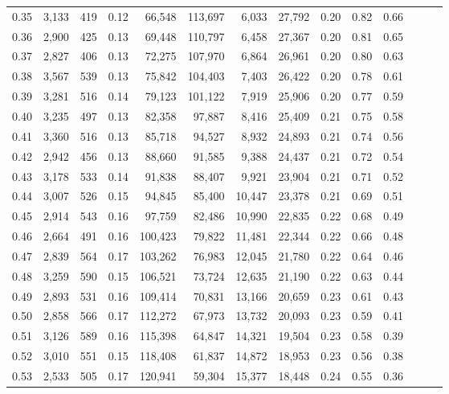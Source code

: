 \begin{tabular}{rrrrrrrrrrrrrr}
0.35 &  3,133 &  419 &  0.12 &   66,548 &  113,697 &   6,033 &  27,792 &  0.20 &  0.82 &      0.66 \\
0.36 &  2,900 &  425 &  0.13 &   69,448 &  110,797 &   6,458 &  27,367 &  0.20 &  0.81 &      0.65 \\
0.37 &  2,827 &  406 &  0.13 &   72,275 &  107,970 &   6,864 &  26,961 &  0.20 &  0.80 &      0.63 \\
0.38 &  3,567 &  539 &  0.13 &   75,842 &  104,403 &   7,403 &  26,422 &  0.20 &  0.78 &      0.61 \\
0.39 &  3,281 &  516 &  0.14 &   79,123 &  101,122 &   7,919 &  25,906 &  0.20 &  0.77 &      0.59 \\
0.40 &  3,235 &  497 &  0.13 &   82,358 &   97,887 &   8,416 &  25,409 &  0.21 &  0.75 &      0.58 \\
0.41 &  3,360 &  516 &  0.13 &   85,718 &   94,527 &   8,932 &  24,893 &  0.21 &  0.74 &      0.56 \\
0.42 &  2,942 &  456 &  0.13 &   88,660 &   91,585 &   9,388 &  24,437 &  0.21 &  0.72 &      0.54 \\
0.43 &  3,178 &  533 &  0.14 &   91,838 &   88,407 &   9,921 &  23,904 &  0.21 &  0.71 &      0.52 \\
0.44 &  3,007 &  526 &  0.15 &   94,845 &   85,400 &  10,447 &  23,378 &  0.21 &  0.69 &      0.51 \\
0.45 &  2,914 &  543 &  0.16 &   97,759 &   82,486 &  10,990 &  22,835 &  0.22 &  0.68 &      0.49 \\
0.46 &  2,664 &  491 &  0.16 &  100,423 &   79,822 &  11,481 &  22,344 &  0.22 &  0.66 &      0.48 \\
0.47 &  2,839 &  564 &  0.17 &  103,262 &   76,983 &  12,045 &  21,780 &  0.22 &  0.64 &      0.46 \\
0.48 &  3,259 &  590 &  0.15 &  106,521 &   73,724 &  12,635 &  21,190 &  0.22 &  0.63 &      0.44 \\
0.49 &  2,893 &  531 &  0.16 &  109,414 &   70,831 &  13,166 &  20,659 &  0.23 &  0.61 &      0.43 \\
0.50 &  2,858 &  566 &  0.17 &  112,272 &   67,973 &  13,732 &  20,093 &  0.23 &  0.59 &      0.41 \\
0.51 &  3,126 &  589 &  0.16 &  115,398 &   64,847 &  14,321 &  19,504 &  0.23 &  0.58 &      0.39 \\
0.52 &  3,010 &  551 &  0.15 &  118,408 &   61,837 &  14,872 &  18,953 &  0.23 &  0.56 &      0.38 \\
0.53 &  2,533 &  505 &  0.17 &  120,941 &   59,304 &  15,377 &  18,448 &  0.24 &  0.55 &      0.36 \\

\end{tabular}
